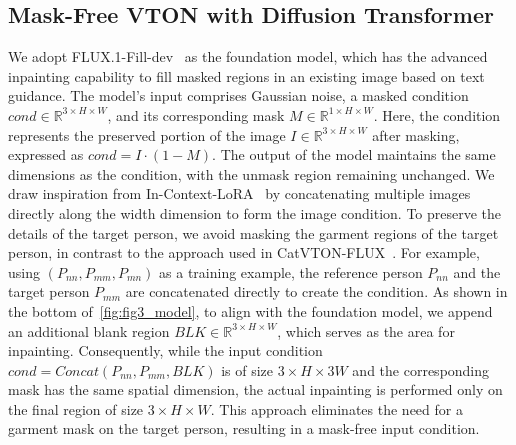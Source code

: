 \subsection{Mask-Free VTON with Diffusion Transformer}\label{sec:VTON}
We adopt FLUX.1-Fill-dev~\cite{flux} as the foundation model, which has the advanced inpainting capability to fill masked regions in an existing image based on text guidance. The model's input comprises Gaussian noise, a masked condition $cond\in\mathbb{R}^{3\times H\times W}$, and its corresponding mask $M\in\mathbb{R}^{1\times H\times W}$. Here, the condition represents the preserved portion of the image $I\in\mathbb{R}^{3\times H\times W}$ after masking, expressed as $cond=I\cdot\left(1-M\right)$. The output of the model maintains the same dimensions as the condition, with the unmask region remaining unchanged. We draw inspiration from In-Context-LoRA~\cite{huang2024context} by concatenating multiple images directly along the width dimension to form the image condition. To preserve the details of the target person, we avoid masking the garment regions of the target person, in contrast to the approach used in CatVTON-FLUX~\cite{catvton-flux}. For example, using $\left(P_{nn}, P_{mm}, P_{mn}\right)$ as a training example, the reference person $P_{nn}$ and the target person $P_{mm}$ are concatenated directly to create the condition. As shown in the bottom of~\cref{fig:fig3_model}, to align with the foundation model, we append an additional blank region $BLK\in\mathbb{R}^{3\times H\times W}$, which serves as the area for inpainting. Consequently, while the input condition $cond=Concat\left(P_{nn}, P_{mm}, BLK\right)$ is of size $3\times H\times 3W$ and the corresponding mask has the same spatial dimension, the actual inpainting is performed only on the final region of size $3\times H\times W$. This approach eliminates the need for a garment mask on the target person, resulting in a mask-free input condition.

